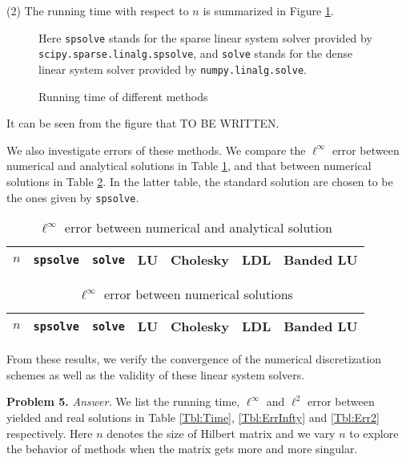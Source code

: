 \documentclass[english, nochinese]{pnote}
\begin{document}
(2) The running time with respect to $n$ is summarized in Figure \ref{Fig:Time}.

\begin{figure}[htb]
{
\centering

\caption{Running time of different methods}
\label{Fig:Time}
}
{
\small
Here \verb"spsolve" stands for the sparse linear system solver provided by \verb"scipy.sparse.linalg.spsolve", and \verb"solve" stands for the dense linear system solver provided by \verb"numpy.linalg.solve".
}
\end{figure}

It can be seen from the figure that {\color{red}TO BE WRITTEN}.

We also investigate errors of these methods. We compare the $\ell^{\infty}$ error between numerical and analytical solutions in Table \ref{Tbl:NumAna}, and that between numerical solutions in Table \ref{Tbl:NumNum}. In the latter table, the standard solution are chosen to be the ones given by \verb"spsolve".

\begin{table}[htb]
\centering
\small
\begin{tabular}{|c|c|c|c|c|c|c|}
\hline
$n$ & \verb"spsolve" & \verb"solve" & LU & Cholesky & LDL & Banded LU \\
\hline

\end{tabular}
\caption{$\ell^{\infty}$ error between numerical and analytical solution}
\label{Tbl:NumAna}
\end{table}

\begin{table}[htb]
\centering
\small
\begin{tabular}{|c|c|c|c|c|c|c|}
\hline
$n$ & \verb"spsolve" & \verb"solve" & LU & Cholesky & LDL & Banded LU \\
\hline

\end{tabular}
\caption{$\ell^{\infty}$ error between numerical solutions}
\label{Tbl:NumNum}
\end{table}

From these results, we verify the convergence of the numerical discretization schemes as well as the validity of these linear system solvers.

\textbf{Problem 5.} \textit{Answer.} We list the running time, $\ell^{\infty}$ and $\ell^2$ error between yielded and real solutions in Table \ref{Tbl:Time}, \ref{Tbl:ErrInfty} and \ref{Tbl:Err2} respectively. Here $n$ denotes the size of Hilbert matrix and we vary $n$ to explore the behavior of methods when the matrix gets more and more singular.
\end{document}
